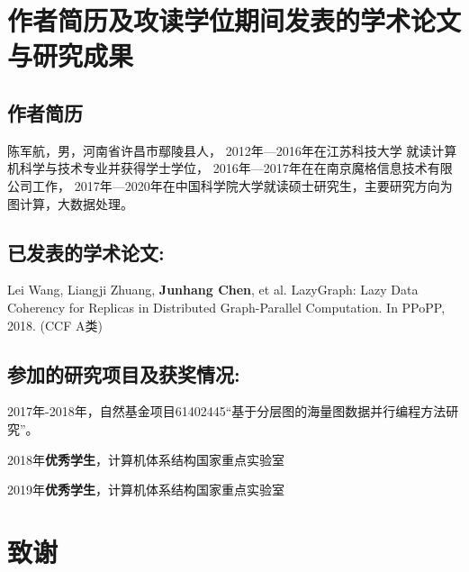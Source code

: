 \chapter{作者简历及攻读学位期间发表的学术论文与研究成果}



\section*{作者简历}

陈军航，男，河南省许昌市鄢陵县人，
2012年—2016年在江苏科技大学 就读计算机科学与技术专业并获得学士学位，
2016年—2017年在在南京魔格信息技术有限公司工作，
2017年—2020年在中国科学院大学就读硕士研究生，主要研究方向为图计算，大数据处理。
  
\section*{已发表的学术论文:}


\begin{enumerate}[{[}1{]}]
    \item Lei Wang, Liangji Zhuang, \textbf{Junhang Chen}, et al. LazyGraph: Lazy Data Coherency for Replicas in Distributed Graph-Parallel Computation. In PPoPP, 2018. (CCF A类)  
\end{enumerate}



\section*{参加的研究项目及获奖情况:}


\begin{enumerate}[{[}1{]}]
  \item  2017年-2018年，自然基金项目61402445“基于分层图的海量图数据并行编程方法研究”。
  \item  2018年\textbf{优秀学生}，计算机体系结构国家重点实验室
  \item  2019年\textbf{优秀学生}，计算机体系结构国家重点实验室
\end{enumerate}



\chapter[致谢]{致\quad 谢}%
\thispagestyle{noheaderstyle}%

